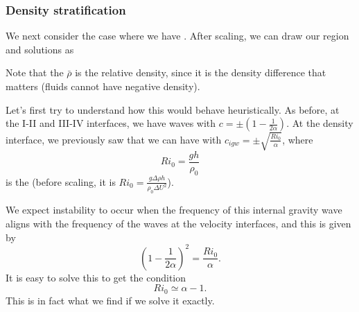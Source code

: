 \documentclass[a4paper]{article}
\begin{document}
\subsubsection*{Density stratification}
We next consider the case where we have . After scaling, we can draw our region and solutions as
\begin{center}
\end{center}
Note that the $\bar{\rho}$ is the relative density, since it is the density difference that matters (fluids cannot have negative density).

Let's first try to understand how this would behave heuristically. As before, at the I-II and III-IV interfaces, we have waves with $c = \pm \left(1 - \frac{1}{2\alpha}\right)$. At the density interface, we previously saw that we can have  with $c_{igw} = \pm \sqrt{\frac{Ri_0}{\alpha}}$, where
\[
  Ri_0 = \frac{g h}{\rho_0}
\]
is the  (before scaling, it is $Ri_0 = \frac{g \Delta \rho h}{\rho_0 \Delta U^2}$).

We expect instability to occur when the frequency of this internal gravity wave aligns with the frequency of the waves at the velocity interfaces, and this is given by
\[
  \left(1 - \frac{1}{2\alpha}\right)^2 = \frac{Ri_0}{\alpha}.
\]
It is easy to solve this to get the condition
\[
  Ri_0 \simeq \alpha - 1.
\]
This is in fact what we find if we solve it exactly.
\end{document}
